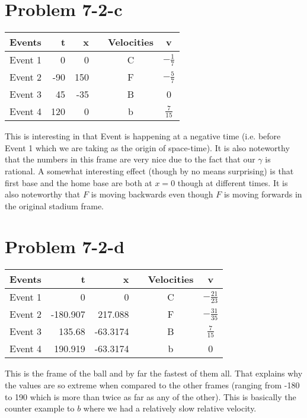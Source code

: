 \section*{Problem 7-2-c}
\begin{center}
\begin{tabular}{ l || r | r  r  c || c }
  Events & t & x && Velocities & v \\ \hline
  Event 1 &    		  0  & 0 			&& C & $-\frac{1}{7}$ \\
  Event 2 &  -90  & 150 && F & $-\frac{5}{7}$\\
  Event 3 &  45  & -35			&& B & 0\\
  Event 4 &  120  & 0 && b & $\frac{7}{15}$
\end{tabular}
\end{center}
This is interesting in that Event is happening at a negative time (i.e. before Event 1 which we are taking as the origin of space-time). It is also noteworthy that the numbers in this frame are very nice due to the fact that our $\gamma$ is rational. A somewhat interesting effect (though by no means surprising) is that first base and the home base are both at $x=0$ though at different times. It is also noteworthy that $F$ is moving backwards even though $F$ is moving forwards in the original stadium frame.
\section*{Problem 7-2-d}
\begin{center}
\begin{tabular}{ l || r | r  r  c || c }
  Events & t & x && Velocities & v \\ \hline
  Event 1 &    		  0  & 0 			&& C & $-\frac{21}{23}$ \\
  Event 2 &  -180.907  & 217.088  && F & $-\frac{31}{35}$\\
  Event 3 &  135.68  & -63.3174				&& B & $\frac{7}{15}$\\
  Event 4 &  190.919  & -63.3174 && b & 0
\end{tabular}
\end{center}
This is the frame of the ball and by far the fastest of them all. That explains why the values are so extreme when compared to the other frames (ranging from -180 to 190 which is more than twice as far as any of the other). This is basically the counter example to $b$ where we had a relatively slow relative velocity. 
